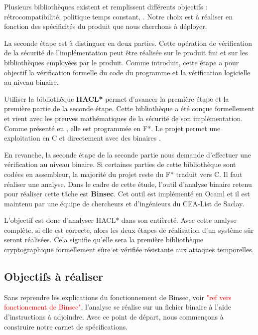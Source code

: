 Plusieurs bibliothèques existent \cite{OpenSSL, BearSSL, polubelova2020haclxn} et remplissent différents objectifs :  rétrocompatibilité, politique temps constant, \etc. Notre choix est à réaliser en fonction des spécificités du produit que nous cherchons à déployer.\medbreak

La seconde étape est à distinguer en deux parties. Cette opération de vérification de la sécurité de l'implémentation peut être réalisée sur le produit fini et sur les bibliothèques employées par le produit. Comme introduit, cette étape a pour objectif la vérification formelle du code du programme et la vérification logicielle au niveau binaire.\medbreak

Utiliser la bibliothèque \textbf{HACL*} \cite{polubelova2020haclxn, HACL*} permet d'avancer la première étape et la première partie de la seconde étape. Cette bibliothèque a été conçue formellement et vient avec les preuves mathématiques de la sécurité de son implémentation. Comme présenté en , elle est programmée en F*. Le projet permet une exploitation en C et directement avec des binaires \cite{HACL*}.\medbreak

En revanche, la seconde étape de la seconde partie nous demande d'effectuer une vérification au niveau binaire. Si certaines parties de cette bibliothèque sont codées en assembleur, la majorité du projet reste du F* traduit vers C. Il faut réaliser une analyse. Dans le cadre de cette étude, l'outil d'analyse binaire retenu pour réaliser cette tâche est \textbf{Binsec}. Cet outil est implémenté en Ocaml et il est maintenu par une équipe de chercheurs et d'ingénieurs du CEA-List de Saclay.\medbreak

L'objectif est donc d'analyser HACL* dans son entièreté. Avec cette analyse complète, si elle est correcte, alors les deux étapes de réalisation d'un système sûr seront réalisées. Cela signifie qu'elle sera la première bibliothèque cryptographique formellement sûre et vérifiée résistante aux attaques temporelles.

\subsection*{Objectifs à réaliser}

Sans reprendre les explications du fonctionnement de Binsec, voir \textcolor{red}{"ref vers fonctionement de Binsec"}, l'analyse se réalise sur un fichier binaire à l'aide d'instructions à adjoindre. Avec ce point de départ, nous commençons à construire notre carnet de spécifications.

